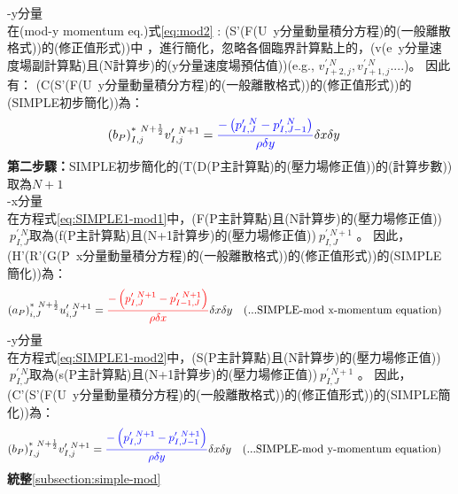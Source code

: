 \documentclass[12pt]{article}
\theoremstyle{upright}
\begin{document}
\noindent -y分量\\
\noindent 在(mod-y momentum eq.)式\eqref{eq:mod2} : (S'(F(U\ y分量動量積分方程)的(一般離散格式))的(修正值形式))中 ，進行簡化，{\color{blue}忽略各個臨界計算點上的，(v(e\ y分量速度場副計算點)且(N計算步)的(y分量速度場預估值))(e.g., $v_{I+2,j}^{\prime\ N},v_{I+1,j}^{\prime\ N}....$)}。
因此有： (C(S'(F(U\ y分量動量積分方程)的(一般離散格式))的(修正值形式))的(SIMPLE初步簡化))為：
\begin{equation}\label{eq:SIMPLE1-mod2}\begin{split}
    &(b_{P})_{I,j}^{*\ N+\frac{1}{2}}v_{I,j}^{\prime\ N+1}  = {\color{blue}\frac{-\left(p_{I,J}^{\prime\ N} - p_{I,J-1}^{\prime\ N}\right)}{\rho \delta y}}\delta x \delta y
\end{split}\end{equation}
\noindent \textbf{第二步驟：}SIMPLE初步簡化的(T(D(P主計算點)的(壓力場修正值))的(計算步數))取為$N+1$ \\
\noindent -x分量\\
\noindent 在方程式\eqref{eq:SIMPLE1-mod1}中，(F(P主計算點)且(N計算步)的(壓力場修正值))$\ p_{I,J}^{\prime \ N}$取為(f(P主計算點)且(N+1計算步)的(壓力場修正值))$\ p_{I,J}^{\prime \ N+1}$ 。
因此，(H'(R'(G(P\ x分量動量積分方程)的(一般離散格式))的(修正值形式))的(SIMPLE簡化))為：
\begin{equation}\label{eq:SIMPLE2-mod1}\begin{split}
    &(a_{P})_{i,J}^{*\ N+\frac{1}{2}}u_{i,J}^{\prime\ N+1}
    ={\color{red}\frac{-\left(p_{I,J}^{\prime\ N+1} - p_{I-1,J}^{\prime\ N+1}\right)}{\rho \delta x}}\delta x \delta y \quad \text{(...SIMPLE-mod x-momentum equation)} 
\end{split}\end{equation}
\noindent -y分量\\
\noindent 在方程式\eqref{eq:SIMPLE1-mod2}中，(S(P主計算點)且(N計算步)的(壓力場修正值))$\ p_{I,J}^{\prime \ N}$取為(s(P主計算點)且(N+1計算步)的(壓力場修正值))$\ p_{I,J}^{\prime \ N+1}$ 。
因此，(C'(S'(F(U\ y分量動量積分方程)的(一般離散格式))的(修正值形式))的(SIMPLE簡化))為：
\begin{equation}\label{eq:SIMPLE2-mod2}\begin{split}
    &(b_{P})_{I,j}^{*\ N+\frac{1}{2}}v_{I,j}^{\prime\ N+1}  = {\color{blue}\frac{-\left(p_{I,J}^{\prime\ N+1} - p_{I,J-1}^{\prime\ N+1}\right)}{\rho \delta y}}\delta x \delta y  \quad \text{(...SIMPLE-mod y-momentum equation)}
\end{split}\end{equation}
\noindent \textbf{統整}\ref{subsection:simple-mod}\\[1.5ex]
\end{document}
